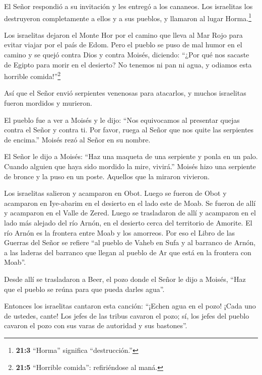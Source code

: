  El Señor respondió a su invitación y les entregó a los
cananeos. Los israelitas los destruyeron completamente a ellos y a sus
pueblos, y llamaron al lugar Horma.\footnote{\textbf{21:3} ``Horma''
  significa ``destrucción.''}

 Los israelitas dejaron el Monte Hor por el camino que lleva
al Mar Rojo para evitar viajar por el país de Edom. Pero el pueblo se
puso de mal humor en el camino  y se quejó contra Dios y
contra Moisés, diciendo: ``¿Por qué nos sacaste de Egipto para morir en
el desierto? No tenemos ni pan ni agua, y odiamos esta horrible
comida!''\footnote{\textbf{21:5} ``Horrible comida'': refiriéndose al
  maná.}

 Así que el Señor envió serpientes venenosas para atacarlos,
y muchos israelitas fueron mordidos y murieron.

 El pueblo fue a ver a Moisés y le dijo: ``Nos equivocamos
al presentar quejas contra el Señor y contra ti. Por favor, ruega al
Señor que nos quite las serpientes de encima.'' Moisés rezó al Señor en
su nombre.

 El Señor le dijo a Moisés: ``Haz una maqueta de una
serpiente y ponla en un palo. Cuando alguien que haya sido mordido la
mire, vivirá.''  Moisés hizo una serpiente de bronce y la
puso en un poste. Aquellos que la miraron vivieron.

 Los israelitas salieron y acamparon en Obot. 
Luego se fueron de Obot y acamparon en Iye-abarim en el desierto en el
lado este de Moab.  Se fueron de allí y acamparon en el
Valle de Zered.  Luego se trasladaron de allí y acamparon
en el lado más alejado del río Arnón, en el desierto cerca del
territorio de Amorite. El río Arnón es la frontera entre Moab y los
amorreos.  Por eso el Libro de las Guerras del Señor se
refiere ``al pueblo de Vaheb en Sufa y al barranco de Arnón,
 a las laderas del barranco que llegan al pueblo de Ar que
está en la frontera con Moab''.

 Desde allí se trasladaron a Beer, el pozo donde el Señor
le dijo a Moisés, ``Haz que el pueblo se reúna para que pueda darles
agua''.

 Entonces los israelitas cantaron esta canción: ``¡Echen
agua en el pozo! ¡Cada uno de ustedes, cante!  Los jefes de
las tribus cavaron el pozo; sí, los jefes del pueblo cavaron el pozo con
sus varas de autoridad y sus bastones''.

